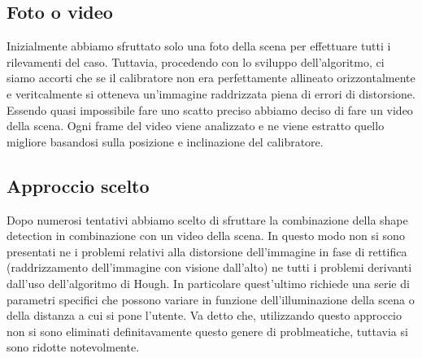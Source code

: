 \documentclass[twoside]{supsistudent}
\begin{document}
\subsection{Foto o video}
Inizialmente abbiamo sfruttato solo una foto della scena per effettuare tutti i rilevamenti del caso. Tuttavia, procedendo con lo sviluppo dell'algoritmo, 
ci siamo accorti che se il calibratore non era perfettamente allineato orizzontalmente e veritcalmente si otteneva un'immagine raddrizzata piena di errori di distorsione. 
Essendo quasi impossibile fare uno scatto preciso abbiamo deciso di fare un video della scena. Ogni frame del video viene analizzato e ne viene estratto quello 
migliore basandosi sulla posizione e inclinazione del calibratore. 
\subsection{Approccio scelto}
Dopo numerosi tentativi abbiamo scelto di sfruttare la combinazione della shape detection in combinazione con un video della scena. In questo modo non si sono presentati ne 
i problemi relativi alla distorsione dell'immagine in fase di rettifica (raddrizzamento dell'immagine con visione dall'alto) ne tutti i problemi derivanti dall'uso dell'algoritmo di Hough.
In particolare quest'ultimo richiede una serie di parametri specifici che possono variare in funzione dell'illuminazione della scena o della distanza a cui si pone l'utente. Va detto che, utilizzando
questo approccio non si sono eliminati definitavamente questo genere di problmeatiche, tuttavia si sono ridotte notevolmente.
\end{document}
